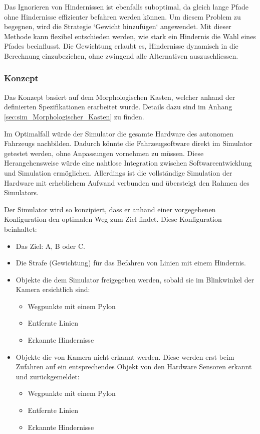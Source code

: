 \documentclass[../main.tex]{subfiles}
\begin{document}
Das Ignorieren von Hindernissen ist ebenfalls suboptimal, da gleich lange Pfade ohne Hindernisse effizienter befahren werden können. Um diesem Problem zu begegnen, wird die Strategie `Gewicht hinzufügen` angewendet. Mit dieser Methode kann flexibel entschieden werden, wie stark ein Hindernis die Wahl eines Pfades beeinflusst. Die Gewichtung erlaubt es, Hindernisse dynamisch in die Berechnung einzubeziehen, ohne zwingend alle Alternativen auszuschliessen.

\subsubsection{Konzept}

Das Konzept basiert auf dem Morphologischen Kasten, welcher anhand der definierten Spezifikationen erarbeitet wurde. Details dazu sind im Anhang \ref{sec:sim_Morphologischer_Kasten} zu finden.

Im Optimalfall würde der Simulator die gesamte Hardware des autonomen Fahrzeugs nachbilden. Dadurch könnte die Fahrzeugsoftware direkt im Simulator getestet werden, ohne Anpassungen vornehmen zu müssen. Diese Herangehensweise würde eine nahtlose Integration zwischen Softwareentwicklung und Simulation ermöglichen. Allerdings ist die vollständige Simulation der Hardware mit erheblichem Aufwand verbunden und übersteigt den Rahmen des Simulators.

Der Simulator wird so konzipiert, dass er anhand einer vorgegebenen Konfiguration den optimalen Weg zum Ziel findet. Diese Konfiguration beinhaltet:
\begin{itemize}
    \item Das Ziel: A, B oder C.
    \item Die Strafe (Gewichtung) für das Befahren von Linien mit einem Hindernis.
    \item Objekte die dem Simulator freigegeben werden, sobald sie im Blinkwinkel der Kamera ersichtlich sind:
     \begin{itemize}
        \item Wegpunkte mit einem Pylon 
        \item Entfernte Linien
        \item Erkannte Hindernisse
     \end{itemize}
   \item Objekte die von Kamera nicht erkannt werden. Diese werden erst beim Zufahren auf ein entsprechendes Objekt von den Hardware Sensoren erkannt und zurückgemeldet:
    \begin{itemize}
      \item Wegpunkte mit einem Pylon 
      \item Entfernte Linien
      \item Erkannte Hindernisse
    \end{itemize}
\end{itemize}
\end{document}

